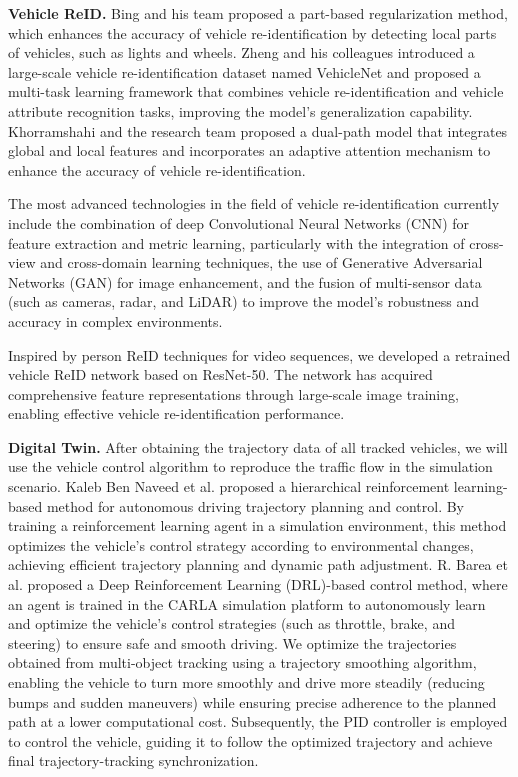 \documentclass[journal,twoside,web]{ieeecolor}
\begin{document}
\textbf{Vehicle ReID.}
Bing and his team proposed a part-based regularization method, which enhances the accuracy of vehicle re-identification by detecting local parts of vehicles, such as lights and wheels\cite{Alpher19b}. 
Zheng and his colleagues introduced a large-scale vehicle re-identification dataset named VehicleNet and proposed a multi-task learning framework that combines vehicle re-identification and vehicle attribute recognition tasks, improving the model's generalization capability\cite{Alpher20f}. 
Khorramshahi and the research team proposed a dual-path model that integrates global and local features and incorporates an adaptive attention mechanism to enhance the accuracy of vehicle re-identification\cite{Alpher19c}.

The most advanced technologies in the field of vehicle re-identification currently include the combination of deep Convolutional Neural Networks (CNN) for feature extraction and metric learning\cite{Alpher20g}, particularly with the integration of cross-view and cross-domain learning techniques, the use of Generative Adversarial Networks (GAN) for image enhancement\cite{Alpher21d}, and the fusion of multi-sensor data (such as cameras, radar, and LiDAR) to improve the model's robustness and accuracy in complex environments\cite{Alpher22g}.

Inspired by person ReID techniques for video sequences, we developed a retrained vehicle ReID network based on ResNet-50. 
The network has acquired comprehensive feature representations through large-scale image training, enabling effective vehicle re-identification performance.

\textbf{Digital Twin.}
After obtaining the trajectory data of all tracked vehicles, we will use the vehicle control algorithm to reproduce the traffic flow in the simulation scenario.
Kaleb Ben Naveed et al. proposed a hierarchical reinforcement learning-based method for autonomous driving trajectory planning and control. 
By training a reinforcement learning agent in a simulation environment, this method optimizes the vehicle's control strategy according to environmental changes, achieving efficient trajectory planning and dynamic path adjustment.\cite{Alpher22}
R. Barea et al. proposed a Deep Reinforcement Learning (DRL)-based control method, where an agent is trained in the CARLA simulation platform to autonomously learn and optimize the vehicle's control strategies (such as throttle, brake, and steering) to ensure safe and smooth driving.\cite{Alpher21}
We optimize the trajectories obtained from multi-object tracking using a trajectory smoothing algorithm, enabling the vehicle to turn more smoothly and drive more steadily (reducing bumps and sudden maneuvers) while ensuring precise adherence to the planned path at a lower computational cost. 
Subsequently, the PID controller is employed to control the vehicle, guiding it to follow the optimized trajectory and achieve final trajectory-tracking synchronization.
\end{document}
